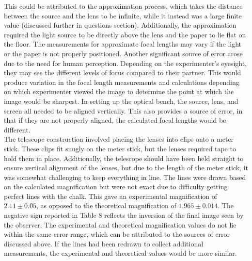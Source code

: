 This could be attributed to the approximation process, which takes the distance between the source and the lens to be infinite, while it instead was a large finite value (discussed further in questions section).
Additionally, the approximation required the light source to be directly above the lens and the paper to lie flat on the floor. 
The measurements for approximate focal lengths may vary if the light or the paper is not properly positioned.
Another significant source of error arose due to the need for human perception. 
Depending on the experimenter's eyesight, they may see the different levels of focus compared to their partner.
This would produce variation in the focal length measurements and calculations depending on which experimenter viewed the image to determine the point at which the image would be sharpest.
In setting up the optical bench, the source, lens, and screen all needed to be aligned vertically. This also provides a source of error, in that if they are not properly aligned, the calculated focal lengths would be different.\\
\indent
The telescope construction involved placing the lenses into clips onto a meter stick. 
These clips fit snugly on the meter stick, but the lenses required tape to hold them in place.
Additionally, the telescope should have been held straight to ensure vertical alignment of the lenses, but due to the length of the meter stick, it was somewhat challenging to keep everything in line.
The lines were drawn based on the calculated magnification but were not exact due to difficulty getting perfect lines with the chalk. 
This gave an experimental magnification of $2.11\pm0.05$, as opposed to the theoretical magnification of $1.965\pm0.014$. 
The negative sign reported in Table 8 reflects the inversion of the final image seen by the observer.
The experimental and theoretical magnification values do not lie within the same error range, which can be attributed to the sources of error discussed above. 
If the lines had been redrawn to collect additional measurements, the experimental and theoretical values would be more similar. 
